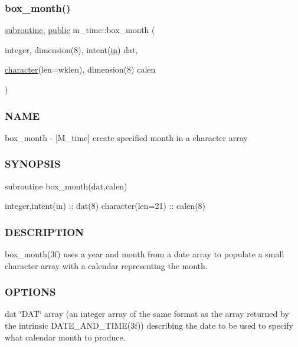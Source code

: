 \subsubsection{\texorpdfstring{box\+\_\+month()}{box\_month()}}
{\footnotesize\ttfamily \hyperlink{M__stopwatch_83_8txt_acfbcff50169d691ff02d4a123ed70482}{subroutine}, \hyperlink{M__stopwatch_83_8txt_a2f74811300c361e53b430611a7d1769f}{public} m\+\_\+time\+::box\+\_\+month (\begin{DoxyParamCaption}\item[{integer, dimension(8), intent(\hyperlink{M__journal_83_8txt_afce72651d1eed785a2132bee863b2f38}{in})}]{dat,  }\item[{\hyperlink{option__stopwatch_83_8txt_abd4b21fbbd175834027b5224bfe97e66}{character}(len=wklen), dimension(8)}]{calen }\end{DoxyParamCaption})}



\subsubsection*{N\+A\+ME}

box\+\_\+month -\/ \mbox{[}M\+\_\+time\mbox{]} create specified month in a character array 

\subsubsection*{S\+Y\+N\+O\+P\+S\+IS}

\begin{DoxyVerb}subroutine box_month(dat,calen)

 integer,intent(in)    :: dat(8)
 character(len=21)     :: calen(8)
\end{DoxyVerb}


\subsubsection*{D\+E\+S\+C\+R\+I\+P\+T\+I\+ON}

box\+\_\+month(3f) uses a year and month from a date array to populate a small character array with a calendar representing the month.

\subsubsection*{O\+P\+T\+I\+O\+NS}

dat \char`\"{}\+D\+A\+T\char`\"{} array (an integer array of the same format as the array returned by the intrinsic D\+A\+T\+E\+\_\+\+A\+N\+D\+\_\+\+T\+I\+M\+E(3f)) describing the date to be used to specify what calendar month to produce.

